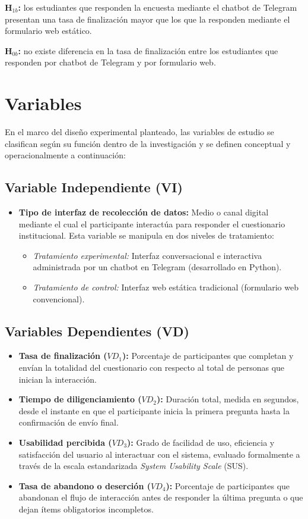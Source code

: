 \documentclass[12pt,letterpaper]{article}
\begin{document}
\textbf{H$_{1b}$:} los estudiantes que responden la encuesta mediante el chatbot de Telegram presentan una tasa de finalización mayor que los que la responden mediante el formulario web estático.

\textbf{H$_{0b}$:} no existe diferencia en la tasa de finalización entre los estudiantes que responden por chatbot de Telegram y por formulario web. 

\section{Variables}

En el marco del diseño experimental planteado, las variables de estudio se clasifican según su función dentro de la investigación y se definen conceptual y operacionalmente a continuación:

\subsection{Variable Independiente (VI)}

\begin{itemize}
    \item \textbf{Tipo de interfaz de recolección de datos:} Medio o canal digital mediante el cual el participante interactúa para responder el cuestionario institucional. Esta variable se manipula en dos niveles de tratamiento:
    \begin{itemize}
        \item \textit{Tratamiento experimental:} Interfaz conversacional e interactiva administrada por un chatbot en Telegram (desarrollado en Python).
        \item \textit{Tratamiento de control:} Interfaz web estática tradicional (formulario web convencional).
    \end{itemize}
\end{itemize}

\subsection{Variables Dependientes (VD)}

\begin{itemize}
    \item \textbf{Tasa de finalización ($VD_1$):} Porcentaje de participantes que completan y envían la totalidad del cuestionario con respecto al total de personas que inician la interacción.
    \item \textbf{Tiempo de diligenciamiento ($VD_2$):} Duración total, medida en segundos, desde el instante en que el participante inicia la primera pregunta hasta la confirmación de envío final.
    \item \textbf{Usabilidad percibida ($VD_3$):} Grado de facilidad de uso, eficiencia y satisfacción del usuario al interactuar con el sistema, evaluado formalmente a través de la escala estandarizada \textit{System Usability Scale} (SUS).
    \item \textbf{Tasa de abandono o deserción ($VD_4$):} Porcentaje de participantes que abandonan el flujo de interacción antes de responder la última pregunta o que dejan ítems obligatorios incompletos.
\end{itemize}
\end{document}
